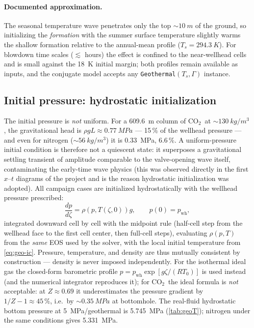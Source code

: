 \documentclass[11pt]{article}
\newcommand{\co}{CO$_2$}
\begin{document}
\paragraph{Documented approximation.} The seasonal temperature wave
penetrates only the top ${\sim}\SI{10}{m}$ of the ground, so
initializing the \emph{formation} with the summer surface temperature
slightly warms the shallow formation relative to the annual-mean
profile ($T_s = \SI{294.3}{K}$). For blowdown time scales
($\lesssim$ hours) the effect is confined to the near-wellhead cells
and is small against the \SI{18}{K} initial margin; both profiles
remain available as inputs, and the conjugate model accepts any
\texttt{Geothermal}$(T_s, \Gamma)$ instance.

\subsection{Initial pressure: hydrostatic initialization}
\label{sec:ic-pressure}

The initial pressure is \emph{not} uniform. For a \SI{609.6}{m} column
of \co\ at ${\sim}\SI{130}{kg/m^3}$, the gravitational head is
$\rho g L \approx \SI{0.77}{MPa}$ --- 15\,\% of the wellhead pressure
--- and even for nitrogen (${\sim}\SI{56}{kg/m^3}$) it is
\SI{0.33}{MPa}, 6.6\,\%. A uniform-pressure initial condition is
therefore not a quiescent state: it superposes a gravitational settling
transient of amplitude comparable to the valve-opening wave itself,
contaminating the early-time wave physics (this was observed directly
in the first $x$--$t$ diagrams of the project and is the reason
hydrostatic initialization was adopted). All campaign cases are
initialized hydrostatically with the wellhead pressure prescribed:
\begin{equation}
\frac{dp}{d\zeta} = \rho\!\left(p, T(\zeta,0)\right) g,
\qquad p(0) = p_{\mathrm{wh}},
\label{eq:hydro}
\end{equation}
integrated downward cell by cell with the midpoint rule
(half-cell step from the wellhead face to the first cell center, then
full-cell steps), evaluating $\rho(p,T)$ from the \emph{same} EOS used
by the solver, with the local initial temperature from
\cref{eq:geo-ic}. Pressure, temperature, and density are thus mutually
consistent by construction --- density is never imposed independently.
For the isothermal ideal gas the closed-form barometric profile
$p = p_{\mathrm{wh}}\exp\!\left[g\zeta/(RT_0)\right]$ is used instead
(and the numerical integrator reproduces it); for \co\ the ideal
formula is \emph{not} acceptable: at $Z \approx 0.69$ it underestimates
the pressure gradient by $1/Z - 1 \approx 45\,\%$, i.e.\ by
${\sim}\SI{0.35}{MPa}$ at bottomhole. The real-fluid hydrostatic bottom
pressure at \SI{5}{MPa}/geothermal is \SI{5.745}{MPa}
(\cref{tab:geoT}); nitrogen under the same conditions gives
\SI{5.331}{MPa}.
\end{document}
